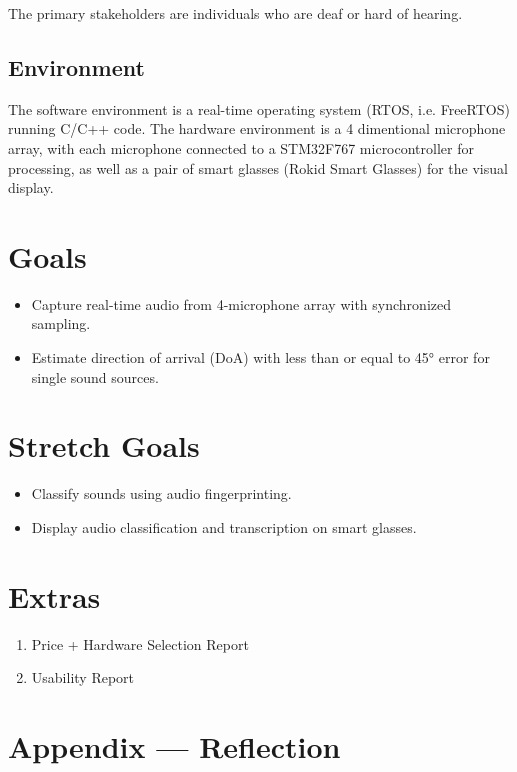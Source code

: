 \documentclass{article}
\begin{document}
The primary stakeholders are individuals who are deaf or hard of hearing.

\subsection{Environment}

The software environment is a real-time operating system (RTOS, i.e. FreeRTOS)
running C/C++ code. The hardware environment is a 4 dimentional microphone
array, with each microphone connected to a STM32F767 microcontroller for
processing, as well as a pair of smart glasses (Rokid Smart Glasses) for the
visual display.

\section{Goals}

\begin{itemize}
    \item Capture real-time audio from 4-microphone array with synchronized
    sampling.
    \item Estimate direction of arrival (DoA) with less than or equal to 45°
    error for single sound sources.
\end{itemize}
\section{Stretch Goals}

\begin{itemize}
    \item Classify sounds using audio fingerprinting.
    \item Display audio classification and transcription on smart glasses.
\end{itemize}
\section{Extras}

\begin{enumerate}
    \item Price + Hardware Selection Report
    \item Usability Report
\end{enumerate} 

\newpage{}

\section*{Appendix --- Reflection}
\end{document}
